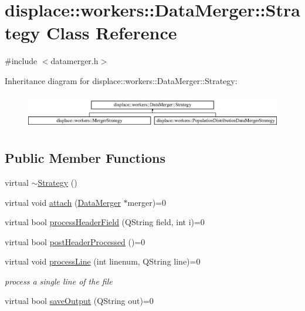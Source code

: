 \hypertarget{classdisplace_1_1workers_1_1_data_merger_1_1_strategy}{}\section{displace\+::workers\+::Data\+Merger\+::Strategy Class Reference}
\label{classdisplace_1_1workers_1_1_data_merger_1_1_strategy}


{\ttfamily \#include $<$datamerger.\+h$>$}

Inheritance diagram for displace\+::workers\+::Data\+Merger\+::Strategy\+:\begin{figure}[H]
\begin{center}
\leavevmode
\includegraphics[height=1.551247cm]{dd/d94/classdisplace_1_1workers_1_1_data_merger_1_1_strategy}
\end{center}
\end{figure}
\subsection*{Public Member Functions}
\begin{DoxyCompactItemize}
\item 
virtual \mbox{\hyperlink{classdisplace_1_1workers_1_1_data_merger_1_1_strategy_ac09cadac24df0b6165c4e70ac36cf9f9}{$\sim$\+Strategy}} ()
\item 
virtual void \mbox{\hyperlink{classdisplace_1_1workers_1_1_data_merger_1_1_strategy_a00af0dfbcdec7b2c65a2533b261fdfd1}{attach}} (\mbox{\hyperlink{classdisplace_1_1workers_1_1_data_merger}{Data\+Merger}} $\ast$merger)=0
\item 
virtual bool \mbox{\hyperlink{classdisplace_1_1workers_1_1_data_merger_1_1_strategy_a00c094e55d6d8413710368af55c55224}{process\+Header\+Field}} (Q\+String field, int i)=0
\item 
virtual bool \mbox{\hyperlink{classdisplace_1_1workers_1_1_data_merger_1_1_strategy_a2ef649650a70b8f1b60ccfe432e6ab5e}{post\+Header\+Processed}} ()=0
\item 
virtual void \mbox{\hyperlink{classdisplace_1_1workers_1_1_data_merger_1_1_strategy_affc6b82b186a4e8fbe2c8adf0a3d136a}{process\+Line}} (int linenum, Q\+String line)=0
\begin{DoxyCompactList}\small\item\em process a single line of the file \end{DoxyCompactList}\item 
virtual bool \mbox{\hyperlink{classdisplace_1_1workers_1_1_data_merger_1_1_strategy_a789b4eee626c5947091e5153e450c91a}{save\+Output}} (Q\+String out)=0
\end{DoxyCompactItemize}


